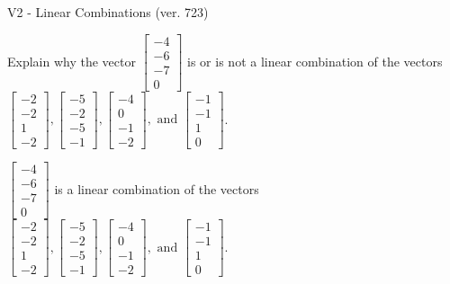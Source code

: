 \begin{exercise}
  \begin{exerciseTitle}V2 - Linear Combinations (ver. 723)\end{exerciseTitle}
  \begin{exerciseStatement}
    Explain why the vector \(\left[\begin{array}{c}
-4 \\
-6 \\
-7 \\
0
\end{array}\right]\)  is or is not a linear 
	combination of the vectors \(\left[\begin{array}{c}
-2 \\
-2 \\
1 \\
-2
\end{array}\right] , \left[\begin{array}{c}
-5 \\
-2 \\
-5 \\
-1
\end{array}\right] , \left[\begin{array}{c}
-4 \\
0 \\
-1 \\
-2
\end{array}\right] , \text{ and } \left[\begin{array}{c}
-1 \\
-1 \\
1 \\
0
\end{array}\right]\).
	


  \end{exerciseStatement}
  \begin{exerciseAnswer}
   \(\left[\begin{array}{c}
-4 \\
-6 \\
-7 \\
0
\end{array}\right]\) 
  	 is  
	a linear combination of the vectors \(\left[\begin{array}{c}
-2 \\
-2 \\
1 \\
-2
\end{array}\right] , \left[\begin{array}{c}
-5 \\
-2 \\
-5 \\
-1
\end{array}\right] , \left[\begin{array}{c}
-4 \\
0 \\
-1 \\
-2
\end{array}\right] , \text{ and } \left[\begin{array}{c}
-1 \\
-1 \\
1 \\
0
\end{array}\right]\).


\end{exerciseAnswer}
\end{exercise}
